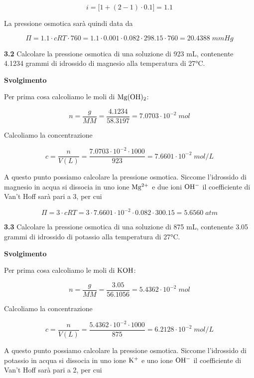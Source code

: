 $$i=\big[1 + (2-1) \cdot 0.1\big]=1.1$$

La pressione osmotica sarà quindi data da

$$\Pi=1.1 \cdot cRT \cdot 760
=1.1 \cdot 0.001 \cdot 0.082 \cdot 298.15 \cdot 760=20.4388\;mmHg$$

\vspace{0.2cm}\textbf{3.2} Calcolare la pressione osmotica di una soluzione di 923 mL, contenente 4.1234 grammi di idrossido di magnesio alla temperatura di 27°C. 

\vspace{0.2cm}\large\textbf{Svolgimento}\normalsize

\vspace{0.2cm}Per prima cosa calcoliamo le moli di $\rm Mg(OH)_2$:

$$n=\frac{g}{MM}=\frac{4.1234}{58.3197}=7.0703 \cdot 10^{-2}\;mol$$

Calcoliamo la concentrazione

$$c=\frac{n}{V(L)}=\frac{7.0703 \cdot 10^{-2} \cdot 1000}{923}=7.6601 \cdot 10^{-2}\;mol/L$$

A questo punto possiamo calcolare la pressione osmotica. Siccome l'idrossido di magnesio in acqua si dissocia in uno ione $\rm Mg^{2+}$ e due ioni $\rm OH^-$ il coefficiente di Van't Hoff sarà pari a 3, per cui

$$\Pi=3 \cdot cRT
=3 \cdot 7.6601 \cdot 10^{-2} \cdot 0.082 \cdot 300.15
=5.6560\;atm$$

\vspace{0.2cm}\textbf{3.3} Calcolare la pressione osmotica di una soluzione di 875 mL, contenente 3.05 grammi di idrossido
di potassio alla temperatura di 27°C.

\vspace{0.2cm}\large\textbf{Svolgimento}\normalsize

\vspace{0.2cm}Per prima cosa calcoliamo le moli di $\rm KOH$:

$$n=\frac{g}{MM}=\frac{3.05}{56.1056}=5.4362 \cdot 10^{-2}\;mol$$

Calcoliamo la concentrazione

$$c=\frac{n}{V(L)}=\frac{5.4362 \cdot 10^{-2} \cdot 1000}{875}=6.2128 \cdot 10^{-2}\;mol/L$$

A questo punto possiamo calcolare la pressione osmotica. Siccome l'idrossido di potassio in acqua si dissocia in uno ione $\rm K^{+}$ e uno ione $\rm OH^-$ il coefficiente di Van't Hoff sarà pari a 2, per cui

